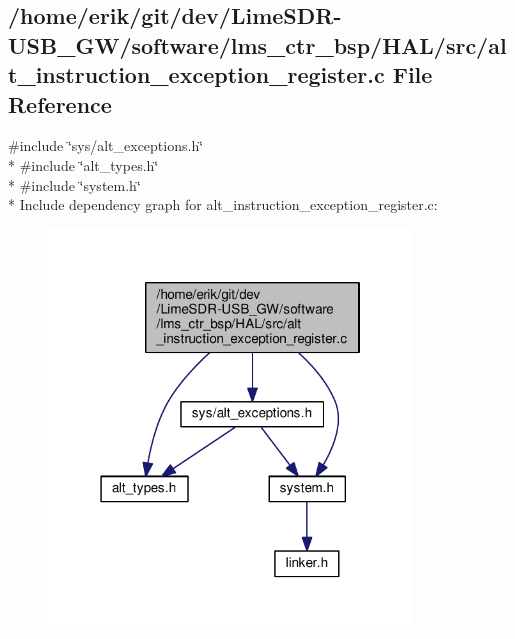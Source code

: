 \subsection{/home/erik/git/dev/\+Lime\+S\+D\+R-\/\+U\+S\+B\+\_\+\+G\+W/software/lms\+\_\+ctr\+\_\+bsp/\+H\+A\+L/src/alt\+\_\+instruction\+\_\+exception\+\_\+register.c File Reference}
\label{alt__instruction__exception__register_8c}
{\ttfamily \#include \char`\"{}sys/alt\+\_\+exceptions.\+h\char`\"{}}\\*
{\ttfamily \#include \char`\"{}alt\+\_\+types.\+h\char`\"{}}\\*
{\ttfamily \#include \char`\"{}system.\+h\char`\"{}}\\*
Include dependency graph for alt\+\_\+instruction\+\_\+exception\+\_\+register.\+c\+:
\nopagebreak
\begin{figure}[H]
\begin{center}
\leavevmode
\includegraphics[width=274pt]{de/d9c/alt__instruction__exception__register_8c__incl}
\end{center}
\end{figure}
